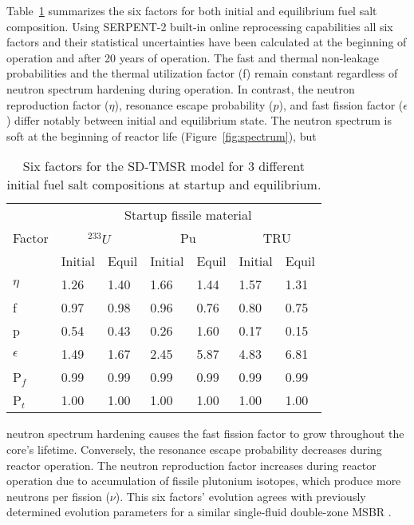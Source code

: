 Table~\ref{tab:six_factor} summarizes the six factors for both initial and 
equilibrium 
fuel salt composition. Using SERPENT-2 built-in online reprocessing 
capabilities all six 
factors and their statistical uncertainties have been calculated at the 
beginning of 
operation and after 20 years of operation. The fast and thermal non-leakage 
probabilities 
and the thermal utilization factor (f)
remain constant regardless of neutron spectrum hardening during operation. In 
contrast, the 
neutron reproduction factor ($\eta$), resonance escape probability ($p$), and 
fast fission 
factor ($\epsilon$) differ notably between initial and equilibrium state. The 
neutron 
spectrum is soft at the beginning of reactor life (Figure~\ref{fig:spectrum}), 
but 
\begin{table} %
	\caption{Six factors for the SD-TMSR model for 3 different initial 
		fuel salt compositions at startup and equilibrium.}
	\begin{tabularx}{\textwidth}{ X | X X | X X | X X } \hline
		\multirow{3}{*}{Factor}  & \multicolumn{6}{c}{Startup fissile 
		material} \\ 
		\space  & \multicolumn{2}{c}{$^{233}U$} & \multicolumn{2}{c}{Pu} & 
		\multicolumn{2}{c}{TRU} \\
		\space  & Initial & Equil & Initial & Equil & Initial & Equil \\ \hline
		$\eta$  & 1.26 & 1.40 & 1.66 & 1.44 & 1.57 & 1.31 \\ 
		f       & 0.97 & 0.98 & 0.96 & 0.76 & 0.80 & 0.75 \\
	    p       & 0.54 & 0.43 & 0.26 & 1.60 & 0.17 & 0.15 \\
		$\epsilon$ & 1.49 & 1.67 & 2.45 & 5.87 & 4.83 & 6.81 \\
		P$_f$   & 0.99 & 0.99 & 0.99 & 0.99& 0.99 & 0.99 \\
        P$_t$   & 1.00 & 1.00 & 1.00 & 1.00 & 1.00 & 1.00 \\ \hline
	\end{tabularx}
	\label{tab:six_factor}
\end{table}
neutron 
spectrum hardening causes the fast fission factor to grow throughout the 
core's lifetime. Conversely, 
the resonance escape probability decreases during reactor operation. The 
neutron reproduction factor increases during reactor operation due to 
accumulation of fissile plutonium 
isotopes, which produce more neutrons per fission ($\nu$). This six factors' 
evolution agrees with 
previously determined evolution parameters for a similar single-fluid 
double-zone \gls{MSBR} \cite{rykhlevskii2019modeling, park_whole_2015}.